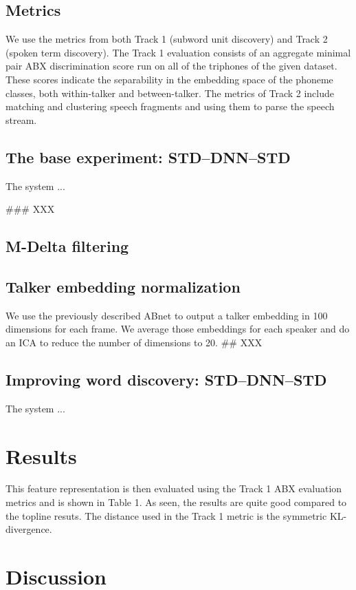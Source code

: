 \documentclass[a4paper]{article}
\begin{document}
\subsection{Metrics}

We use the metrics from both Track 1 (subword unit discovery) and Track 2 (spoken term discovery). The Track 1 evaluation consists of an aggregate minimal pair ABX discrimination score run on all of the triphones of the given dataset. These scores indicate the separability in the embedding space of the phoneme classes, both within-talker and between-talker. The metrics of Track 2 include matching and clustering speech fragments and using them to parse the speech stream. 

\subsection{The base experiment: STD--DNN--STD}

The system ...

### XXX
\subsection{M-Delta filtering}
\subsection{Talker embedding normalization}
We use the previously described ABnet to output a talker embedding in 100 dimensions for each frame. We average those embeddings for each speaker and do an ICA to reduce the number of dimensions to 20. 
## XXX

\subsection{Improving word discovery: STD--DNN--STD}

The system ...

\section{Results}
This feature representation is then evaluated using the Track 1 ABX evaluation metrics and is shown in Table 1.
As seen, the results are quite good compared to the topline resuts. The distance used in the Track 1 metric is the symmetric KL-divergence.

\section{Discussion}
\end{document}
